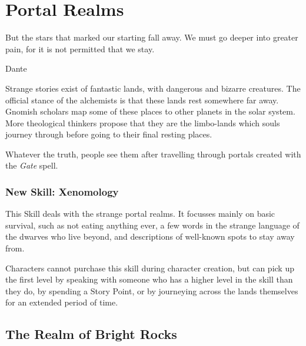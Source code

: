 \chapter{Portal Realms}
\label{ether}
\label{portalRealms}

\epigraph{But the stars that marked our starting fall away.
We must go deeper into greater pain,
for it is not permitted that we stay.}{Dante}

\begin{multicols}{2}

\noindent
Strange stories exist of fantastic lands, with dangerous and bizarre creatures.  The official stance of the \gls{alchemists} is that these lands rest somewhere far away.
Gnomish scholars map some of these places to other planets in the solar system.
More theological thinkers propose that they are the limbo-lands which souls journey through before going to their final resting places.

Whatever the truth, people see them after travelling through portals created with the \textit{Gate} spell.

\subsection{New Skill: Xenomology}
\label{Xenomology}

This Skill deals with the strange portal realms.
It focusses mainly on basic survival, such as not eating anything ever, a few words in the strange language of the dwarves who live beyond, and descriptions of well-known spots to stay away from.

Characters cannot purchase this skill during character creation, but can pick up the first level by speaking with someone who has a higher level in the skill than they do, by spending a Story Point, or by journeying across the lands themselves for an extended period of time.

\end{multicols}

\section{The Realm of Bright Rocks}
\label{brightrocks}

